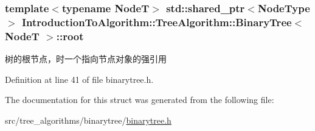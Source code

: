 \subsubsection[{root}]{\setlength{\rightskip}{0pt plus 5cm}template$<$typename Node\+T$>$ std\+::shared\+\_\+ptr$<${\bf Node\+Type}$>$ {\bf Introduction\+To\+Algorithm\+::\+Tree\+Algorithm\+::\+Binary\+Tree}$<$ Node\+T $>$\+::root}\label{struct_introduction_to_algorithm_1_1_tree_algorithm_1_1_binary_tree_aa0d43af70ef50ff59740dced2e832074}
树的根节点，时一个指向节点对象的强引用 

Definition at line 41 of file binarytree.\+h.



The documentation for this struct was generated from the following file\+:\begin{DoxyCompactItemize}
\item 
src/tree\+\_\+algorithms/binarytree/\hyperlink{binarytree_8h}{binarytree.\+h}\end{DoxyCompactItemize}
